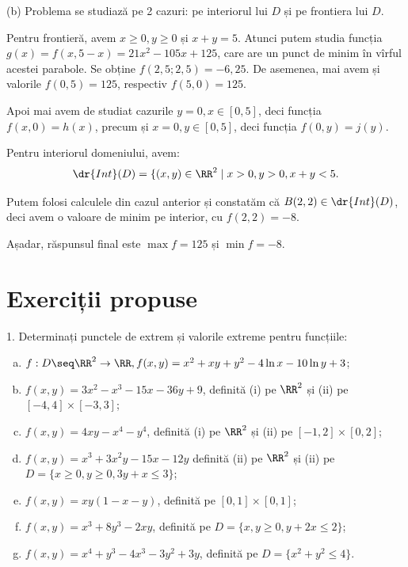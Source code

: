 \vspace{1cm}

(b) Problema se studiază pe 2 cazuri: pe interiorul lui $ D $ și pe frontiera lui $ D $.

Pentru frontieră, avem $ x \geq 0, y \geq 0 $ și $ x + y = 5 $. Atunci putem
studia funcția $ g(x) = f(x, 5-x) = 21x^2 - 105x + 125 $, care are un punct
de minim în vîrful acestei parabole. Se obține $ f(2,5; 2,5) = -6,25 $.
De asemenea, mai avem și valorile $ f(0, 5) = 125 $, respectiv $ f(5, 0) = 125 $.

Apoi mai avem de studiat cazurile $ y = 0, x \in [0, 5] $, deci funcția
$ f(x, 0) = h(x) $, precum și $ x = 0, y \in [0, 5] $, deci funcția
$ f(0, y) = j(y) $.

Pentru interiorul domeniului, avem:
\[
  \dr{Int}(D) = \{ (x, y) \in \RR^2 \mid x > 0, y > 0, x + y < 5.
\]

Putem folosi calculele din cazul anterior și constatăm că $ B(2, 2) \in \dr{Int}(D) $,
deci avem o valoare de minim pe interior, cu $ f(2, 2) = -8 $.

Așadar, răspunsul final este $ \max f = 125 $ și $ \min f = -8 $.


\section{Exerciții propuse}

1. Determinați punctele de extrem și valorile extreme pentru funcțiile:
\begin{enumerate}[(a)]
\item $ f : D \seq \RR^2 \to \RR, f(x, y) = x^2 + xy + y^2 - 4 \ln x - 10\ln y + 3 $;
\item $ f(x, y) = 3x^2 - x^3 - 15x - 36y + 9 $, definită (i) pe $ \RR^2 $
  și (ii) pe $ [-4,4] \times [-3, 3] $;
\item $ f(x, y) = 4xy - x^4 - y^4 $, definită (i) pe $ \RR^2 $ și (ii) pe
  $ [-1, 2] \times [0, 2] $;
\item $ f(x, y) = x^3 + 3x^2y - 15x - 12y $ definită (ii) pe $ \RR^2 $ și
  (ii) pe $ D = \{ x \geq 0, y \geq 0, 3y + x \leq 3 \} $;
\item $ f(x, y) = xy(1 - x - y) $, definită pe $ [0, 1] \times [0, 1] $;
\item $ f(x, y) = x^3 + 8y^3 - 2xy $, definită pe $ D = \{ x, y \geq 0, y + 2x \leq 2 \} $;
\item $ f(x, y) = x^4 + y^3 - 4x^3 - 3y^2 + 3y $, definită pe
  $ D = \{ x^2 + y^2 \leq 4 \} $.
\end{enumerate}
 
